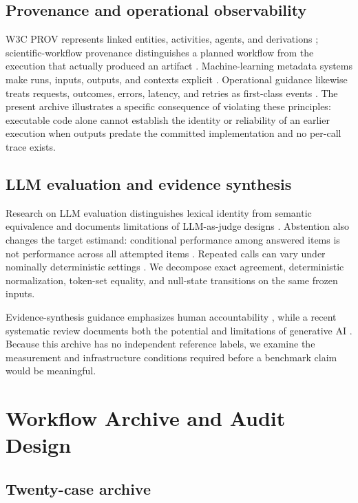 \documentclass[acmsmall,anonymous,review]{acmart}
\begin{document}
\subsection{Provenance and operational observability}

W3C PROV represents linked entities, activities, agents, and derivations \cite{w3cprov2013}; scientific-workflow provenance distinguishes a planned workflow from the execution that actually produced an artifact \cite{davidson2008provenance}. Machine-learning metadata systems make runs, inputs, outputs, and contexts explicit \cite{polyzotis2021mlmd}. Operational guidance likewise treats requests, outcomes, errors, latency, and retries as first-class events \cite{sre2016monitoring,otel2025genai}. The present archive illustrates a specific consequence of violating these principles: executable code alone cannot establish the identity or reliability of an earlier execution when outputs predate the committed implementation and no per-call trace exists.

\subsection{LLM evaluation and evidence synthesis}

Research on LLM evaluation distinguishes lexical identity from semantic equivalence and documents limitations of LLM-as-judge designs \cite{kamalloo2023qa,zheng2023judge}. Abstention also changes the target estimand: conditional performance among answered items is not performance across all attempted items \cite{wen2025abstention}. Repeated calls can vary under nominally deterministic settings \cite{pagnamenta2025nondeterminism}. We decompose exact agreement, deterministic normalization, token-set equality, and null-state transitions on the same frozen inputs.

Evidence-synthesis guidance emphasizes human accountability \cite{flemyng2025ai}, while a recent systematic review documents both the potential and limitations of generative AI \cite{clark2025genai}. Because this archive has no independent reference labels, we examine the measurement and infrastructure conditions required before a benchmark claim would be meaningful.

\section{Workflow Archive and Audit Design}

\subsection{Twenty-case archive}
\end{document}
